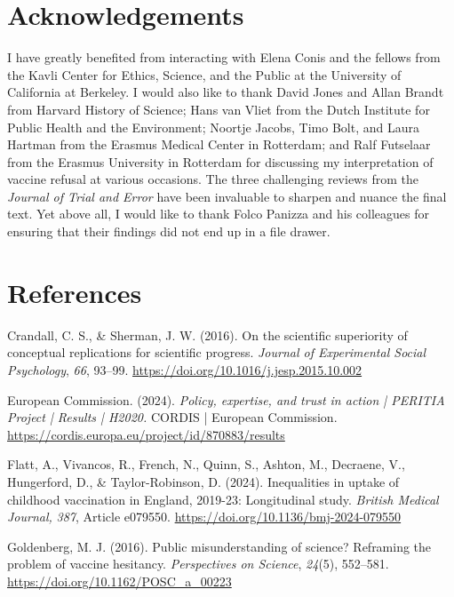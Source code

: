 \documentclass[authordate, reflection]{jote-new-article}
\begin{document}
	\section{Acknowledgements}



	I have greatly benefited from interacting with Elena Conis and the fellows from the Kavli Center for Ethics, Science, and the Public at the University of California at Berkeley. I would also like to thank David Jones and Allan Brandt from Harvard History of Science; Hans van Vliet from the Dutch Institute for Public Health and the Environment; Noortje Jacobs, Timo Bolt, and Laura Hartman from the Erasmus Medical Center in Rotterdam; and Ralf Futselaar from the Erasmus University in Rotterdam for discussing my interpretation of vaccine refusal at various occasions. The three challenging reviews from the \emph{Journal of Trial and Error} have been invaluable to sharpen and nuance the final text. Yet above all, I would like to thank Folco Panizza and his colleagues for ensuring that their findings did not end up in a file drawer.







	\section{References}



	Crandall, C. S., \& Sherman, J. W. (2016). On the scientific superiority of conceptual replications for scientific progress. \emph{Journal of Experimental Social Psychology}, \emph{66}, 93--99. \url{https://doi.org/10.1016/j.jesp.2015.10.002}



	European Commission. (2024). \emph{Policy, expertise, and trust in action | PERITIA Project | Results | H2020. }CORDIS | European Commission. \url{https://cordis.europa.eu/project/id/870883/results}



	Flatt, A., Vivancos, R., French, N., Quinn, S., Ashton, M., Decraene, V., Hungerford, D., \& Taylor-Robinson, D. (2024). Inequalities in uptake of childhood vaccination in England, 2019-23: Longitudinal study. \emph{British Medical Journal,} \emph{387}, Article e079550. \url{https://doi.org/10.1136/bmj-2024-079550}



	Goldenberg, M. J. (2016). Public misunderstanding of science? Reframing the problem of vaccine hesitancy. \emph{Perspectives on Science}, \emph{24}(5), 552--581. \url{https://doi.org/10.1162/POSC\_a\_00223}
\end{document}
